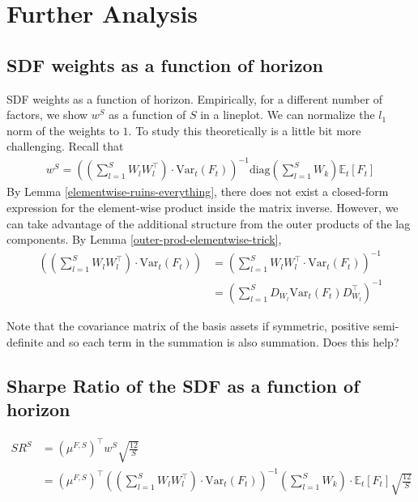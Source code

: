 \documentclass{article}
\begin{document}
\section{Further Analysis}

\subsection{SDF weights as a function of horizon}

SDF weights as a function of horizon. Empirically, for a different number of factors, 
we show $w^S$ as a function of $S$ in a lineplot. We can normalize the $l_1$ norm of the weights to $1$. 
To study this theoretically is a little bit more challenging. Recall that 
\begin{align*}
    w^S = \left( \left( \sum_{l=1}^S W_l W_l^\top\right) \cdot \text{Var}_t(F_t) \right)^{-1} \text{diag}\left(\sum_{l=1}^S W_k \right) \mathbb{E}_t [F_t] 
\end{align*}
By Lemma \ref{elementwise-ruins-everything}, there does not exist a closed-form expression for 
the element-wise product inside the matrix inverse. However, we can take advantage of the additional structure from the outer products of the 
lag components. By Lemma \ref{outer-prod-elementwise-trick}, 
\begin{align*}
    \left( \left( \sum_{l=1}^S W_l W_l^\top \right) \cdot \text{Var}_t(F_t)\right) &= \left(\sum_{l=1}^S W_l W_l^\top \cdot \text{Var}_t(F_t)\right)^{-1}\\
    &= \left(\sum_{l=1}^S D_{W_l}\text{Var}_t(F_t)D_{W_l}^\top\right)^{-1}
\end{align*} 

Note that the covariance matrix of the basis assets if symmetric, positive semi-definite and so
each term in the summation is also summation. Does this help?



\subsection{Sharpe Ratio of the SDF as a function of horizon}

\begin{align*}
    SR^S &= (\mu^{F, S})^\top w^S \sqrt{\frac{12}{S}}\\
    &= (\mu^{F, S})^\top \left( \left( \sum_{l=1}^S W_l W_l^\top\right) \cdot \text{Var}_t(F_t) \right)^{-1} \left(\sum_{l=1}^S W_k \right) \cdot \mathbb{E}_t [F_t] \sqrt{\frac{12}{S}}
\end{align*}
\end{document}

